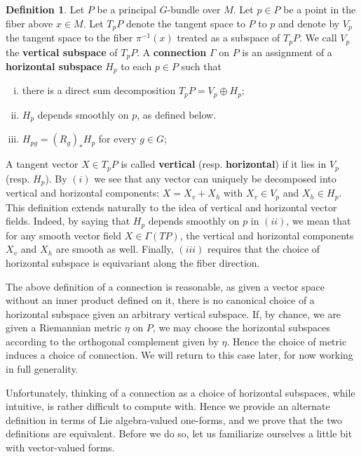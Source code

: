 \documentclass{book}
\theoremstyle{plain}
\theoremstyle{definition}
\newtheorem{defn}{Definition}
\theoremstyle{remark}
\begin{document}

\begin{defn}
    \label{defn:conn}
    Let $P$ be a principal $G$-bundle over $M$. Let $p\in P$ be a point in the fiber above $x\in M$. Let $T_pP$ denote the tangent space to $P$ to $p$
    and denote by $V_p$ the tangent space to the fiber $\pi^{-1}(x)$ treated as a subspace of $T_pP$. We call $V_p$ the \textbf{vertical subspace} of
    $T_pP$. A \textbf{connection} $\Gamma$ on $P$ is an assignment of a \textbf{horizontal subspace} $H_p$ to each $p\in P$ such that
    \begin{enumerate}[(i)]
        \item there is a direct sum decomposition $T_pP=V_p\oplus H_p;$
        \item $H_p$ depends smoothly on $p$, as defined below.
        \item $H_{pg}=(R_g)_*H_p$ for every $g\in G$;
    \end{enumerate}
    A tangent vector $X\in T_pP$ is called \textbf{vertical} (resp. \textbf{horizontal}) if it lies in $V_p$ (resp. $H_p$). By 
    $(i)$ we see that any vector can uniquely be decomposed into vertical and horizontal components: $X=X_v+X_h$ with
    $X_v\in V_p$ and $X_h\in H_p$. This definition extends naturally to the idea of vertical and horizontal vector fields.
    Indeed, by saying that $H_p$ depends smoothly on $p$ in $(ii)$, we mean that for any smooth vector field $X\in \Gamma(TP)$, the vertical
    and horizontal components $X_v$ and $X_h$ are smooth as well. Finally, $(iii)$ requires that the choice of horizontal subspace is equivariant along the fiber direction.
\end{defn}

The above definition of a connection is reasonable, as given a vector space without an inner product defined on it, there is no canonical choice
of a horizontal subspace given an arbitrary vertical subspace. If, by chance, we are given a Riemannian metric $\eta$ on $P$, we may choose the horizontal
subspaces according to the orthogonal complement given by $\eta$. Hence the choice of metric induces a choice of connection.
We will return to this case later, for now working in full generality.

Unfortunately, thinking of a connection as a choice of horizontal subspaces,
while intuitive, is rather difficult to compute with. Hence we provide an alternate definition in terms of Lie algebra-valued one-forms, and we
prove that the two definitions are equivalent. Before we do so, let us familiarize ourselves a little bit with vector-valued forms.
\end{document}
